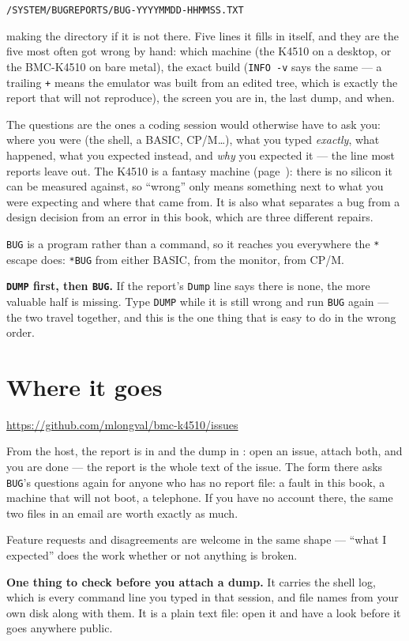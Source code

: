 \begin{center}
\texttt{/SYSTEM/BUGREPORTS/BUG-YYYYMMDD-HHMMSS.TXT}
\end{center}

\noindent making the directory if it is not there. Five lines it fills
in itself, and they are the five most often got wrong by hand: which
machine (the K4510 on a desktop, or the BMC-K4510 on bare metal), the exact build
(\verb|INFO -v| says the same --- a trailing \verb|+| means the emulator
was built from an edited tree, which is exactly the report that will not
reproduce), the screen you are in, the last dump, and when.

The questions are the ones a coding session would otherwise have to ask
you: where you were (the shell, a BASIC, CP/M\ldots), what you typed
\emph{exactly}, what happened, what you expected instead, and \emph{why}
you expected it --- the line most reports leave out. The K4510 is a
fantasy machine (page~\pageref{cha:disclaimer}): there is no silicon it
can be measured against, so ``wrong'' only means something next to what
you were expecting and where that came from. It is also what separates a
bug from a design decision from an error in this book, which are three
different repairs.

\verb|BUG| is a program rather than a command, so it reaches you
everywhere the \texttt{*} escape does: \verb|*BUG| from either BASIC,
from the monitor, from CP/M.

\begin{aside}
\textbf{\texttt{DUMP} first, then \texttt{BUG}.} If the report's
\texttt{Dump} line says there is none, the more valuable half is missing.
Type \verb|DUMP| while it is still wrong and run \verb|BUG| again ---
the two travel together, and this is the one thing that is easy to do in
the wrong order.
\end{aside}

\section{Where it goes}
\begin{center}
\url{https://github.com/mlongval/bmc-k4510/issues}
\end{center}

\noindent From the host, the report is in  and
the dump in : open an issue, attach both, and you are done ---
the report is the whole text of the issue. The form there asks
\verb|BUG|'s questions again for anyone who has no report file: a fault
in this book, a machine that will not boot, a telephone. If you have no
account there, the same two files in an email are worth exactly as much.

Feature requests and disagreements are welcome in the same shape ---
``what I expected'' does the work whether or not anything is broken.

\begin{aside}
\textbf{One thing to check before you attach a dump.} It carries the
shell log, which is every command line you typed in that session, and
file names from your own disk along with them. It is a plain text file:
open it and have a look before it goes anywhere public.
\end{aside}
